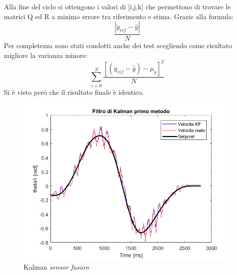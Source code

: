 Alla fine del ciclo si ottengono i valori di [i,j,k] che permettono di trovare le matrici Q ed R a minimo errore tra riferimento e stima. Grazie alla formula:
\begin{equation}
\frac{|\dot{y}_{rif}-\dot{\hat{y}}|}{N}
\end{equation} 
Per completezza sono stati condotti anche dei test scegliendo come risultato migliore la varianza minore:
\begin{equation}
\sum_{i=0}^{N} \frac{[(\dot{y}_{rif}-\dot{\hat{y}}) - \mu_y]^2}{N}
\end{equation}
Si è visto però che il risultato finale è identico.
\begin{figure}[ht]
	\begin{center}
		\includegraphics[scale=0.52]{Immagini/Kalman1}
		\caption{Kalman \textit{sensor fusion}}
		\label{fig:kalman}
	\end{center}
\end{figure}
